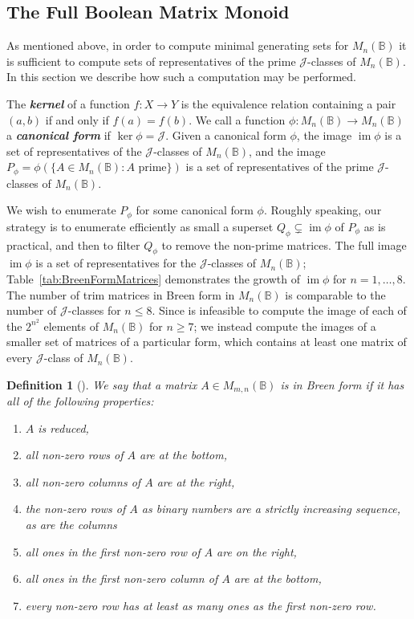 \documentclass[11pt]{article}
\newtheorem{defi}[thm]{Definition}
\newenvironment{de}[1][]{\begin{defi}[#1]\rm}{\end{defi}}
\newcommand{\defn}[1]{\textbf{\textit{#1}}}
\numberwithin{equation}{section}
\newcommand{\set}[2]{\ensuremath{\{#1 : #2 \}}}
\renewcommand{\to}{\longrightarrow}
\DeclareMathOperator{\im}{im}
\newcommand{\B}{\mathbb{B}}
\newcommand{\Bn}{M_n(\B)}
\newcommand{\Bmn}{M_{m,n}(\B)}
\newcommand{\J}{\mathscr{J}}
\begin{document}
\subsection{The Full Boolean Matrix Monoid}
\label{sec:FullBoolMat}
As mentioned above, in order to compute minimal generating sets for $\Bn$ it is
sufficient to compute sets of representatives of the prime $\J$-classes of
$\Bn$. In this section we describe how such a computation may be performed.

The \defn{kernel} of a function $f: X \to Y$ is the equivalence relation
containing a pair $(a, b)$ if and only if $f(a) = f(b)$.
We call a function $\phi: \Bn \to \Bn$ a \defn{canonical form} if
$\ker\phi = \J$. Given a canonical form $\phi$, the image $\im\phi$ is a
set of representatives of the $\J$-classes of $\Bn$, and the image
$P_\phi = \phi(\set{A \in \Bn}{\text{$A$ prime}})$ is a set of
representatives of the prime $\J$-classes of $\Bn$. 

We wish to enumerate $P_\phi$ for some canonical form $\phi$. Roughly speaking,
our strategy is to enumerate efficiently as small a superset $Q_\phi \subsetneq
\im\phi$ of $P_\phi$ as is practical, and then to filter $Q_\phi$ to remove the
non-prime matrices.
The full image $\im\phi$ is a set of representatives for the $\J$-classes of
$\Bn$; Table~\ref{tab:BreenFormMatrices} demonstrates the growth of $\im\phi$ for
$n = 1, \ldots, 8$. The number of trim matrices in Breen form in $\Bn$ is
comparable to the number of $\J$-classes for $n \leq 8$.
Since is infeasible to compute the image of each of the $2^{n^2}$ elements of
$\Bn$ for $n \geq 7$; we instead compute the images of a smaller set of matrices
of a particular form, which contains at least one matrix of every $\J$-class of
$\Bn$.

\begin{de}[{{\cite[Proposition 3.6]{Breen1997aa}}}]
  We say that a matrix $A \in \Bmn$ is in \emph{Breen form} if it has all of
  the following properties:
  \begin{enumerate}[label={\rm (\roman*)}]
  \item{$A$ is reduced,}
  \item{all non-zero rows of $A$ are at the bottom,}
  \item{all non-zero columns of $A$ are at the right,}
  \item{the non-zero rows of $A$ as binary numbers are a strictly increasing
      sequence, as are the columns}
  \item{all ones in the first non-zero row of $A$ are on the right,}
  \item{all ones in the first non-zero column of $A$ are at the bottom,}
  \item{every non-zero row has at least as many ones as the first non-zero row.}
  \end{enumerate}
\end{de}
\end{document}
